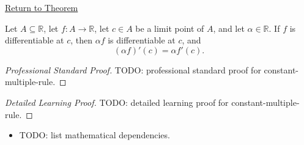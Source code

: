 \newpage
{}
\label{prf:constant-multiple-rule}

\begin{remark*}[Return]
\hyperref[thm:constant-multiple-rule]{Return to Theorem}
\end{remark*}

\begin{theorem*}
Let $A \subseteq \mathbb{R}$, let $f : A \to \mathbb{R}$, let $c \in A$ be a limit point of $A$, and let $\alpha \in \mathbb{R}$. If $f$ is differentiable at $c$, then $\alpha f$ is differentiable at $c$, and
\[
(\alpha f)'(c) = \alpha f'(c).
\]
\end{theorem*}

\begin{proof}[Professional Standard Proof]
\LRAProofBodyStart
TODO: professional standard proof for constant-multiple-rule.
\end{proof}

\begin{proof}[Detailed Learning Proof]
\LRAProofBodyStart
TODO: detailed learning proof for constant-multiple-rule.
\end{proof}

\begin{remark*}
\end{remark*}

\begin{dependencies}
\begin{itemize}
  \item TODO: list mathematical dependencies.
\end{itemize}
\end{dependencies}

\clearpage
